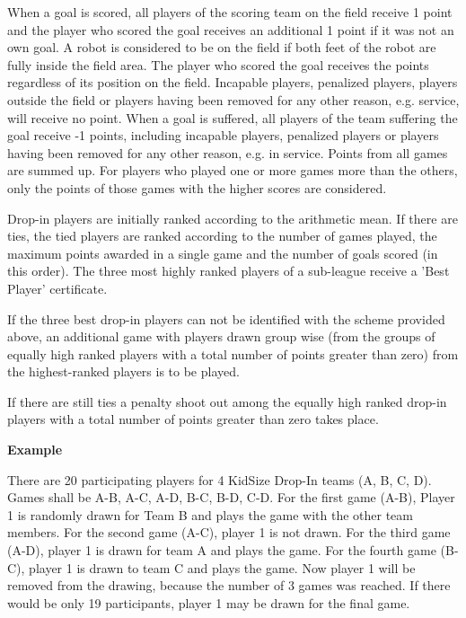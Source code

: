 When a goal is scored, all players of the scoring team on the field receive 1 point and the player who scored the goal receives an additional 1 point if it was not an own goal. A robot is considered to be on the field if both feet of the robot are fully inside the field area. The player who scored the goal receives the points regardless of its position on the field. Incapable players, penalized players, players outside the field or players having been removed for any other reason, e.g. service, will receive no point. When a goal is suffered, all players of the team suffering the goal receive -1 points,  including incapable players, penalized players or players having been removed for any other reason, e.g. in service. Points from all games are summed up. For players who played one or more games more than the others, only the points of those games with the higher scores are considered.

Drop-in players are initially ranked according to the arithmetic mean.
If there are ties, the tied players are ranked according to the number of games played,
the maximum points awarded in a single game and the number of goals scored (in
this order).
The three most highly ranked players of a sub-league receive a 'Best Player' certificate.

If the three best drop-in players can not be identified with the scheme provided above, an additional game with players drawn group wise (from the groups of equally high ranked players with a total number of points greater than zero) from the highest-ranked players is to be played.

If there are still ties a penalty shoot out among the equally high ranked drop-in players with a total number of points greater than zero takes place.

\bigskip 
 
{\bfseries Example}
 
There are 20 participating players for 4 KidSize Drop-In teams (A, B, C, D). Games shall be A-B, A-C, A-D, B-C, B-D, C-D. For the first game (A-B), Player 1 is randomly drawn for Team B and plays the game with the other team members. For the second game (A-C), player 1 is not drawn. For the third game (A-D), player 1 is drawn for team A and plays the game. For the fourth game (B-C), player 1 is drawn to team C and plays the game. Now player 1 will be removed from the drawing, because the number of 3 games was reached. If there would be only 19 participants, player 1 may be drawn for the final game.

